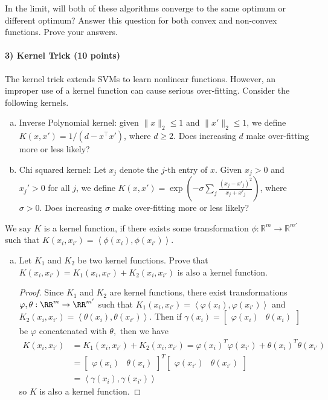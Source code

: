 \documentclass{article}
\begin{document}
In the limit, will both of these algorithms converge to the same optimum or different optimum? Answer this question for both convex and non-convex functions. Prove your answers.

\paragraph{3) Kernel Trick (10 points)}
The kernel trick extends SVMs to learn nonlinear functions. However, an improper use of a kernel function can cause serious over-fitting. Consider the following kernels.
\begin{enumerate}[(a)]
	\item Inverse Polynomial kernel: given $\|x\|_2\leq 1$ and $\|x'\|_2\leq 1$, we define $K(x, x') = 1/(d-x^\top x')$, where $d\geq 2$. Does increasing $d$ make over-fitting more or less likely?

	\item Chi squared kernel: Let $x_j$ denote the $j$-th entry of $x$. Given $x_j>0$ and $x_j'>0$ for all $j$, we define $K(x, x') = \exp\left(-\sigma\sum_j\frac{(x_j-x'_j)^2}{x_j+x'_j}\right)$, where $\sigma>0$. Does increasing $\sigma$ make over-fitting more or less likely?

\end{enumerate}
We say $K$ is a kernel function, if there exists some transformation $\phi:\mathbb{R}^m\rightarrow \mathbb{R}^{m'}$ such that $K(x_i,x_{i'}) = \left<\phi(x_i),\phi(x_{i'})\right>$.
\begin{enumerate}[(c)]
	\item Let $K_1$ and $K_2$ be two kernel functions. Prove that $K(x_i,x_{i'}) = K_1(x_i,x_{i'}) + K_2(x_i,x_{i'})$ is also a kernel function.
		\begin{proof}
			Since $K_1$ and $K_2$ are kernel functions, there exist transformations $\varphi, \theta:\RR^m\to\RR^{m'}$ such that $K_1(x_i, x_{i'}) = \left< \varphi(x_i), \varphi(x_{i'})\right>$ and $K_2(x_i, x_{i'}) = \left< \theta(x_i), \theta(x_{i'})\right>.$ Then if $\gamma(x_i)=\begin{bmatrix}
				\varphi(x_i) & \theta(x_i)
			\end{bmatrix}$ be $\varphi$ concatenated with $\theta,$ then we have
			\begin{align*}
				K(x_i, x_{i'}) &= K_1(x_i, x_{i'}) + K_2(x_i, x_{i'}) = \varphi(x_i)^T \varphi(x_{i'}) + \theta(x_i)^T\theta(x_{i'}) \\
				&= \begin{bmatrix}
					\varphi(x_i) & \theta(x_i)
				\end{bmatrix}^T \begin{bmatrix}
					\varphi(x_{i'}) & \theta(x_{i'})
				\end{bmatrix} \\
				&= \left< \gamma(x_i), \gamma(x_{i'})\right>
			\end{align*}
			so $K$ is also a kernel function.
		\end{proof}
\end{enumerate}
\end{document}
